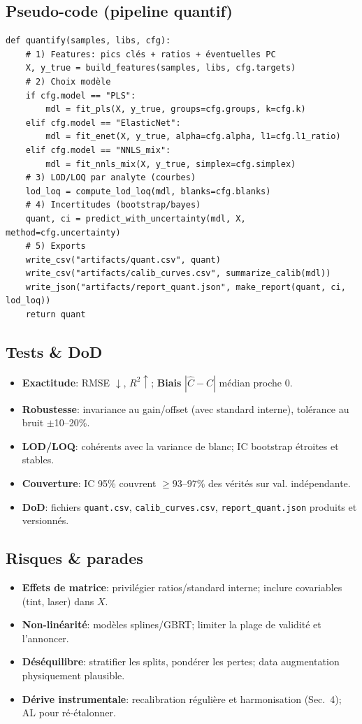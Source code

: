 \subsection{Pseudo-code (pipeline quantif)}
\begin{lstlisting}[basicstyle=\ttfamily\small]
def quantify(samples, libs, cfg):
    # 1) Features: pics clés + ratios + éventuelles PC
    X, y_true = build_features(samples, libs, cfg.targets)
    # 2) Choix modèle
    if cfg.model == "PLS":
        mdl = fit_pls(X, y_true, groups=cfg.groups, k=cfg.k)
    elif cfg.model == "ElasticNet":
        mdl = fit_enet(X, y_true, alpha=cfg.alpha, l1=cfg.l1_ratio)
    elif cfg.model == "NNLS_mix":
        mdl = fit_nnls_mix(X, y_true, simplex=cfg.simplex)
    # 3) LOD/LOQ par analyte (courbes)
    lod_loq = compute_lod_loq(mdl, blanks=cfg.blanks)
    # 4) Incertitudes (bootstrap/bayes)
    quant, ci = predict_with_uncertainty(mdl, X, method=cfg.uncertainty)
    # 5) Exports
    write_csv("artifacts/quant.csv", quant)
    write_csv("artifacts/calib_curves.csv", summarize_calib(mdl))
    write_json("artifacts/report_quant.json", make_report(quant, ci, lod_loq))
    return quant
\end{lstlisting}

\subsection{Tests \& DoD}
\begin{itemize}[nosep]
\item \textbf{Exactitude}: RMSE $\downarrow$, $R^2\uparrow$; \textbf{Biais} $|\hat{C}-C|$ médian proche 0.
\item \textbf{Robustesse}: invariance au gain/offset (avec standard interne), tolérance au bruit $\pm$10--20\%.
\item \textbf{LOD/LOQ}: cohérents avec la variance de blanc; IC bootstrap étroites et stables.
\item \textbf{Couverture}: IC 95\% couvrent $\ge 93$--$97$\% des vérités sur val. indépendante.
\item \textbf{DoD}: fichiers \texttt{quant.csv}, \texttt{calib\_curves.csv}, \texttt{report\_quant.json} produits et versionnés.
\end{itemize}

\subsection{Risques \& parades}
\begin{itemize}[nosep]
\item \textbf{Effets de matrice}: privilégier ratios/standard interne; inclure covariables (tint, laser) dans $X$.
\item \textbf{Non-linéarité}: modèles splines/GBRT; limiter la plage de validité et l'annoncer.
\item \textbf{Déséquilibre}: stratifier les splits, pondérer les pertes; data augmentation physiquement plausible.
\item \textbf{Dérive instrumentale}: recalibration régulière et harmonisation (Sec.~4); AL pour ré-étalonner.
\end{itemize}



